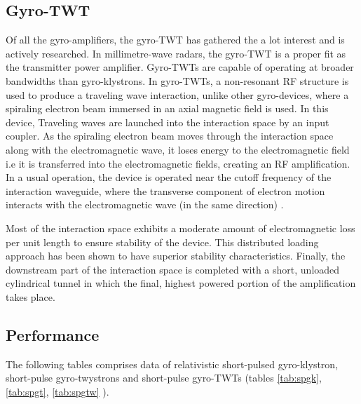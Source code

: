 \subsection{Gyro-TWT}
Of all the gyro-amplifiers, the gyro-TWT has gathered the a lot interest and is actively researched. In millimetre-wave radars, the gyro-TWT is a proper fit as the transmitter power amplifier. Gyro-TWTs are capable of operating at broader bandwidths than gyro-klystrons. In gyro-TWTs, a non-resonant RF structure is used to produce a traveling wave interaction, unlike other gyro-devices, where a spiraling electron beam immersed in an axial magnetic field is used. In this device, Traveling waves are launched into the interaction space by an input coupler. As the spiraling electron beam moves through the interaction space along with the electromagnetic wave, it loses energy to the electromagnetic field i.e it is transferred into the electromagnetic fields, creating an RF amplification. In a usual operation, the device is operated near the cutoff frequency of the interaction waveguide, where the transverse component of electron motion interacts with the electromagnetic wave (in the same direction) .

Most of the interaction space exhibits a moderate amount of electromagnetic loss per unit length to ensure stability of the device. This distributed loading approach has been shown to have superior stability characteristics. Finally, the downstream part of the interaction space is completed with a short, unloaded cylindrical tunnel in which the final, highest powered portion of the amplification takes place.

\subsection{Performance}
The following tables comprises data of relativistic short-pulsed gyro-klystron,  short-pulse gyro-twystrons and short-pulse gyro-TWTs (tables \ref{tab:spgk}, \ref{tab:spgt}, \ref{tab:spgtw} ).

\begin{table}[H]
	\caption{Relativistic Short-Pulse Gyro-Klystrons\cite{ref:soa} }
	\label{tab:spgk}
\end{table}

